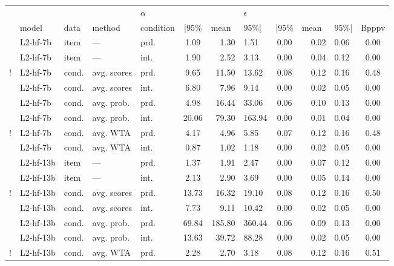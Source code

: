 \documentclass[fleqn]{article}
\begin{document}
\begin{table}[t]
\centering
\begin{tabular}{cllllcrlcrlc}
  \toprule
  &&&& $\alpha$ &&& $\epsilon$ & \\ \cmidrule(r){4-6} \cmidrule(l){7-9}
  & model & data & method & condition & |95\% & mean\ & 95\%| & |95\% & mean\ & 95\%| & Bpppv \\
  \midrule

    & L2-hf-7b    & item  & ---         & prd. & 1.09  & 1.30   & 1.51   & 0.00 & 0.02 & 0.06 & 0.00 \\
    & L2-hf-7b    & item  & ---         & int. & 1.90  & 2.52   & 3.13   & 0.00 & 0.04 & 0.12 & 0.00 \\
  ! & L2-hf-7b    & cond. & avg. scores & prd. & 9.65  & 11.50  & 13.62  & 0.08 & 0.12 & 0.16 & 0.48 \\
    & L2-hf-7b    & cond. & avg. scores & int. & 6.80  & 7.96   & 9.14   & 0.00 & 0.02 & 0.05 & 0.00 \\
    & L2-hf-7b    & cond. & avg. prob.  & prd. & 4.98  & 16.44  & 33.06  & 0.06 & 0.10 & 0.13 & 0.00 \\
    & L2-hf-7b    & cond. & avg. prob.  & int. & 20.06 & 79.30  & 163.94 & 0.00 & 0.01 & 0.04 & 0.00 \\
  ! & L2-hf-7b    & cond. & avg. WTA    & prd. & 4.17  & 4.96   & 5.85   & 0.07 & 0.12 & 0.16 & 0.48 \\
    & L2-hf-7b    & cond. & avg. WTA    & int. & 0.87  & 1.02   & 1.18   & 0.00 & 0.02 & 0.05 & 0.00 \\ \addlinespace[0.5em]
    & L2-hf-13b   & item  & ---         & prd. & 1.37  & 1.91   & 2.47   & 0.00 & 0.07 & 0.12 & 0.00 \\
    & L2-hf-13b   & item  & ---         & int. & 2.13  & 2.90   & 3.69   & 0.00 & 0.05 & 0.14 & 0.00 \\
  ! & L2-hf-13b   & cond. & avg. scores & prd. & 13.73 & 16.32  & 19.10  & 0.08 & 0.12 & 0.16 & 0.50 \\
    & L2-hf-13b   & cond. & avg. scores & int. & 7.73  & 9.11   & 10.42  & 0.00 & 0.02 & 0.05 & 0.00 \\
    & L2-hf-13b   & cond. & avg. prob.  & prd. & 69.84 & 185.80 & 360.44 & 0.06 & 0.09 & 0.13 & 0.00 \\
    & L2-hf-13b   & cond. & avg. prob.  & int. & 13.63 & 39.72  & 88.28  & 0.00 & 0.02 & 0.05 & 0.00 \\
  ! & L2-hf-13b   & cond. & avg. WTA    & prd. & 2.28  & 2.70   & 3.18   & 0.08 & 0.12 & 0.16 & 0.51 \\

\end{tabular}
\end{table}
\end{document}
